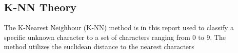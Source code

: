 \subsection{K-NN Theory}
The K-Nearest Neighbour (K-NN) method is in this report used to classify a specific unknown character to a set of characters ranging from 0 to 9.
The method utilizes the euclidean distance to the nearest characters

